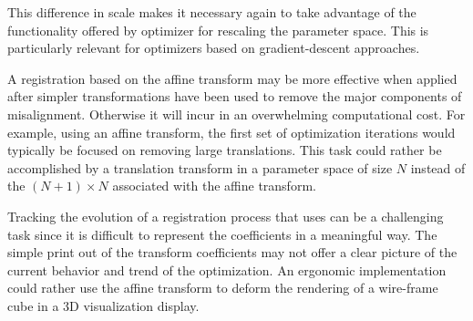 This difference in scale makes it necessary again to take advantage of the
functionality offered by optimizer for rescaling the parameter space. This is
particularly relevant for optimizers based on gradient-descent approaches.

A registration based on the affine transform may be more effective when applied
after simpler transformations have been used to remove the major components of
misalignment. Otherwise it will incur in an overwhelming computational
cost. For example, using an affine transform, the first set of optimization
iterations would typically be focused on removing large translations. This task
could rather be accomplished by a translation transform in a parameter space of
size $N$ instead of the $(N+1) \times N$ associated with the affine transform.

Tracking the evolution of a registration process that uses
 can be a challenging task since it is difficult to
represent the coefficients in a meaningful way.  The simple print out of the
transform coefficients may not offer a clear picture of the current behavior
and trend of the optimization.  An ergonomic implementation could rather use
the affine transform to deform the rendering of a wire-frame cube in a 3D
visualization display.


